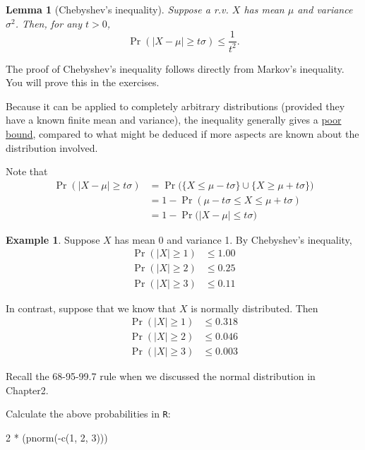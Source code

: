 \documentclass[
]{book}
\newenvironment{Shaded}{\begin{snugshade}}{\end{snugshade}}
\newcommand{\DecValTok}[1]{\textcolor[rgb]{0.00,0.00,0.81}{#1}}
\newcommand{\FunctionTok}[1]{\textcolor[rgb]{0.00,0.00,0.00}{#1}}
\newcommand{\NormalTok}[1]{#1}
\newcommand{\SpecialCharTok}[1]{\textcolor[rgb]{0.00,0.00,0.00}{#1}}
\newtheorem{lemma}{Lemma}[chapter]
\theoremstyle{definition}
\theoremstyle{definition}
\newtheorem{example}{Example}[chapter]
\theoremstyle{definition}
\theoremstyle{definition}
\theoremstyle{remark}
\begin{document}
\begin{lemma}[Chebyshev's inequality]
Suppose a r.v. \(X\) has mean \(\mu\) and variance \(\sigma^2\). Then, for any
\(t>0\), \[\Pr(|X-\mu| \geq t\sigma) \leq \frac{1}{t^2}.\]
\end{lemma}

The proof of Chebyshev's inequality follows directly from Markov's inequality. You will prove this in the exercises.

Because it can be applied to completely arbitrary distributions (provided they have a known finite mean and variance), the inequality generally gives a \uline{poor bound}, compared to what might be deduced if more aspects are known about the distribution involved.

Note that
\begin{align*}
\Pr(|X-\mu| \geq t\sigma)
&= \Pr\big(\{ X \leq \mu - t\sigma \} \cup \{ X \geq \mu + t\sigma \}\big) \\
&= 1 - \Pr( \mu - t\sigma \leq X \leq \mu + t\sigma ) \\
&= 1 - \Pr\big(|X-\mu| \leq t\sigma\big)
\end{align*}

\begin{example}
Suppose \(X\) has mean 0 and variance 1. By Chebyshev's inequality,
\[\begin{aligned}
    \Pr(|X| \geq 1) &\leq 1.00 \\
    \Pr(|X| \geq 2) &\leq 0.25 \\
    \Pr(|X| \geq 3) &\leq 0.11 
  \end{aligned}\]

In contrast, suppose that we know that \(X\) is normally
distributed. Then \[\begin{aligned}
    \Pr(|X| \geq 1) &\leq 0.318 \\
    \Pr(|X| \geq 2) &\leq 0.046 \\
    \Pr(|X| \geq 3) &\leq 0.003 
  \end{aligned}\]

Recall the 68-95-99.7 rule when we discussed the normal distribution in Chapter2.
\end{example}

Calculate the above probabilities in \texttt{R}:

\begin{Shaded}
\begin{Highlighting}[]
\DecValTok{2} \SpecialCharTok{*}\NormalTok{ (}\FunctionTok{pnorm}\NormalTok{(}\SpecialCharTok{{-}}\FunctionTok{c}\NormalTok{(}\DecValTok{1}\NormalTok{, }\DecValTok{2}\NormalTok{, }\DecValTok{3}\NormalTok{)))}
\end{Highlighting}
\end{Shaded}
\end{document}
